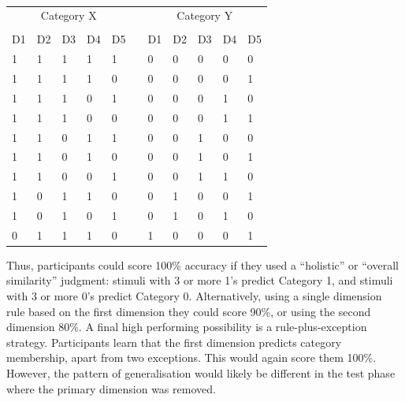 \documentclass[doc, a4paper, apacite]{apa6}
\begin{document}
\begin{table}[t]
	\centering
	\caption{}
	\label{table:abstractStructure}
	\begin{tabular}{lllllllllll}
		\toprule
		\multicolumn{5}{c}{Category X} &  & \multicolumn{5}{c}{Category Y} \\
		\cline{1-5} \cline{7-11} \\
		D1   & D2   & D3   & D4  & D5  &  & D1   & D2   & D3   & D4  & D5  \\
		\midrule
		1    & 1    & 1    & 1   & 1   &  & 0    & 0    & 0    & 0   & 0   \\
		1    & 1    & 1    & 1   & 0   &  & 0    & 0    & 0    & 0   & 1   \\
		1    & 1    & 1    & 0   & 1   &  & 0    & 0    & 0    & 1   & 0   \\
		1    & 1    & 1    & 0   & 0   &  & 0    & 0    & 0    & 1   & 1   \\
		1    & 1    & 0    & 1   & 1   &  & 0    & 0    & 1    & 0   & 0   \\
		1    & 1    & 0    & 1   & 0   &  & 0    & 0    & 1    & 0   & 1   \\
		1    & 1    & 0    & 0   & 1   &  & 0    & 0    & 1    & 1   & 0   \\
		1    & 0    & 1    & 1   & 0   &  & 0    & 1    & 0    & 0   & 1   \\
		1    & 0    & 1    & 0   & 1   &  & 0    & 1    & 0    & 1   & 0   \\
		0    & 1    & 1    & 1   & 0   &  & 1    & 0    & 0    & 0   & 1   \\
		\bottomrule
	\end{tabular}	
\end{table}

Thus, participants could score 100\% accuracy if they used a ``holistic'' or ``overall similarity'' judgment: stimuli with 3 or more 1's predict Category 1, and stimuli with 3 or more 0's predict Category 0. 
Alternatively, using a single dimension rule based on the first dimension they could score 90\%, or using the second dimension 80\%. 
A final high performing possibility is a rule-plus-exception strategy.
Participants learn that the first dimension predicts category membership, apart from two exceptions. 
This would again score them 100\%. 
However, the pattern of generalisation would likely be different in the test phase where the primary dimension was removed. 
\end{document}
